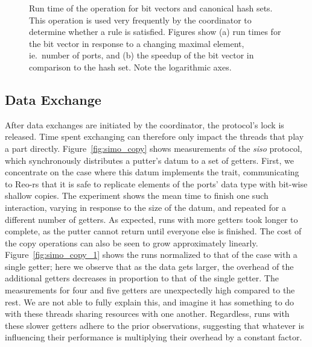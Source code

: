 \begin{figure}
{\begin{subfigure}[b]{0.63\textwidth}
			\caption{}
			\label{fig:bits_1}
		\end{subfigure}%
	}
	\caption[Bit vector speedup over hashset.]{Run time of the  operation for bit vectors and canonical hash sets. This operation is used very frequently by the coordinator to determine whether a rule is satisfied. Figures show (a) run times for the bit vector in response to a changing maximal element, ie.\ number of ports, and (b) the speedup of the bit vector in comparison to the hash set. Note the logarithmic axes.}
	\label{fig:bits}
\end{figure}



\subsection{Data Exchange}
After data exchanges are initiated by the coordinator, the protocol's lock is released. Time spent exchanging can therefore only impact the threads that play a part directly. Figure~\ref{fig:simo_copy} shows measurements of the \textit{siso} protocol, which synchronously distributes a putter's datum to a set of getters. First, we concentrate on the case where this datum implements the  trait, communicating to Reo-rs that it is safe to replicate elements of the ports' data type with bit-wise shallow copies. The experiment shows the mean time to finish one such interaction, varying in response to the size of the datum, and repeated for a different number of getters. As expected, runs with more getters took longer to complete, as the putter cannot return until everyone else is finished. The cost of the copy operations can also be seen to grow approximately linearly. Figure~\ref{fig:simo_copy_1} shows the runs normalized to that of the case with a single getter; here we observe that as the data gets larger, the overhead of the additional getters decreases in proportion to that of the single getter. The measurements for four and five getters are unexpectedly high compared to the rest. We are not able to fully explain this, and imagine it has something to do with these threads sharing resources with one another. Regardless, runs with these slower getters adhere to the prior observations, suggesting that whatever is influencing their performance is multiplying their overhead by a constant factor.

